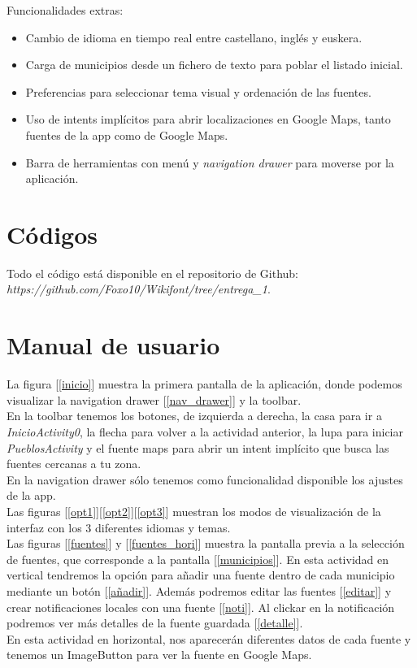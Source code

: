 \documentclass[11pt,a4paper]{article}
\begin{document}
	
    Funcionalidades extras:\\
    
\begin{itemize}
  \item Cambio de idioma en tiempo real entre castellano, inglés y euskera.
  \item Carga de municipios desde un fichero de texto para poblar el listado inicial.
  \item Preferencias para seleccionar tema visual y ordenación de las fuentes.
  \item Uso de intents implícitos para abrir localizaciones en Google Maps, tanto fuentes de la app como de Google Maps.
  \item Barra de herramientas con menú y \textit{navigation drawer} para moverse por la aplicación.
\end{itemize}


\section{Códigos}

Todo el código está disponible en el repositorio de Github: \\ \textit{https://github.com/Foxo10/Wikifont/tree/entrega\_1}.



\section{Manual de usuario}

	La figura [\ref{inicio}] muestra la primera pantalla de la aplicación, donde podemos visualizar la navigation drawer [\ref{nav_drawer}] y la toolbar. \\
    En la toolbar tenemos los botones, de izquierda a derecha, la casa para ir a \textit{InicioActivity0}, la flecha para volver a la actividad anterior, la lupa para iniciar \textit{PueblosActivity} y el fuente maps para abrir un intent implícito que busca las fuentes cercanas a tu zona. \\
    En la navigation drawer sólo tenemos como funcionalidad disponible los ajustes de la app.\\

    Las figuras [\ref{opt1}][\ref{opt2}][\ref{opt3}] muestran los modos de visualización de la interfaz con los 3 diferentes idiomas y temas. \\
    
    Las figuras [\ref{fuentes}] y [\ref{fuentes_hori}] muestra la pantalla previa a la selección de fuentes, que corresponde a la pantalla [\ref{municipios}]. En esta actividad en vertical tendremos la opción para añadir una fuente dentro de cada municipio mediante un botón [\ref{añadir}]. Además podremos editar las fuentes [\ref{editar}] y crear notificaciones locales con una fuente [\ref{noti}]. Al clickar en la notificación podremos ver más detalles de la fuente guardada [\ref{detalle}]. \\
    En esta actividad en horizontal, nos aparecerán diferentes datos de cada fuente y tenemos un ImageButton para ver la fuente en Google Maps.\\
\end{document}
